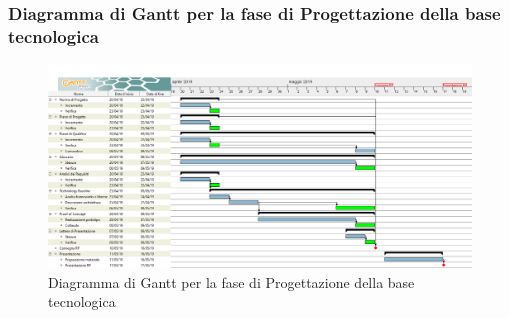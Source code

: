 \subsubsection{Diagramma di Gantt per la fase di Progettazione della base tecnologica}
\begin{figure}[h!]
\begin{center}
  \includegraphics[scale=0.285]{immagini/ProgettazioneGantt.png}
  \caption{Diagramma di Gantt per la fase di Progettazione della base tecnologica}
  \end{center}
\end{figure}


